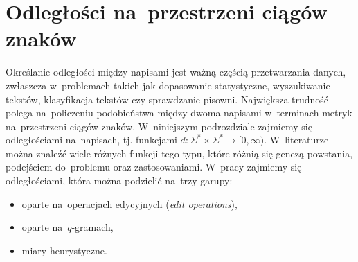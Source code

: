 \documentclass{praca1}
\begin{document}
%




\section{Odległości na~przestrzeni ciągów znaków}

Określanie odległości między napisami jest ważną częścią przetwarzania danych, zwłaszcza w~problemach takich jak dopasowanie statystyczne, wyszukiwanie tekstów, klasyfikacja tekstów czy sprawdzanie pisowni. Największa trudność polega na~policzeniu podobieństwa między dwoma napisami w~terminach metryk na~przestrzeni ciągów znaków.  W~niniejszym podrozdziale zajmiemy się odległościami na~napisach, tj. funkcjami $d: \Sigma^* \times \Sigma^* \rightarrow [0, \infty)$. W~literaturze można znaleźć wiele różnych funkcji tego typu, które różnią się genezą powstania, podejściem do~problemu oraz zastosowaniami. W~pracy zajmiemy się odległościami, która można podzielić na~trzy garupy:
\begin{itemize}
\item oparte na~operacjach edycyjnych (\emph{edit operations}),
\item oparte na~$q$-gramach,
\item miary heurystyczne.
\end{itemize}
\end{document}
